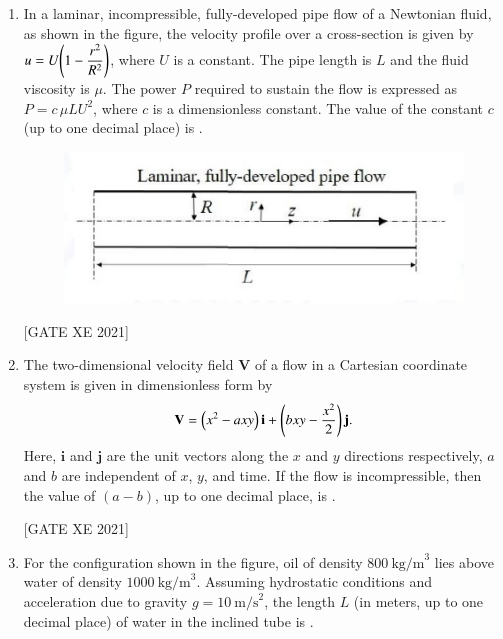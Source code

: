 \documentclass[journal,12pt,onecolumn]{IEEEtran}
\theoremstyle{remark}
\begin{document}
\begin{enumerate}
\hfill[GATE XE 2021]

\begin{multicols}{2}
\begin{enumerate}
\item $a\,u_0\,\mu$
\item $2a\,u_0\,\mu$
\item $3a\,u_0\,\mu$
\item $4a\,u_0\,\mu$
\end{enumerate}
\end{multicols}


\item In a laminar, incompressible, fully-developed pipe flow of a Newtonian fluid, as shown in the figure, the velocity profile over a cross-section is given by $u=U\!\left(1-\dfrac{r^2}{R^2}\right)$, where $U$ is a constant. The pipe length is $L$ and the fluid viscosity is $\mu$. The power $P$ required to sustain the flow is expressed as $P=c\,\mu L U^2$, where $c$ is a dimensionless constant. The value of the constant $c$ (up to one decimal place) is \underline{\hspace{2cm}}.

\begin{figure}[H]
      \centering
      \includegraphics[width=0.5\columnwidth]{figs/fig11.png}
      \caption{}
      \label{fig:placeholder}
  \end{figure}

\hfill[GATE XE 2021]


\item The two-dimensional velocity field $\mathbf{V}$ of a flow in a Cartesian coordinate system is given in dimensionless form by
\begin{align}
\mathbf{V}=\left(x^2 -a x y\right)\mathbf{i}+\left(b x y-\frac{x^2}{2}\right)\mathbf{j}.
\end{align}
Here, $\mathbf{i}$ and $\mathbf{j}$ are the unit vectors along the $x$ and $y$ directions respectively, $a$ and $b$ are independent of $x$, $y$, and time. If the flow is incompressible, then the value of $(a-b)$, up to one decimal place, is \underline{\hspace{2cm}}.

\hfill[GATE XE 2021]


\item For the configuration shown in the figure, oil of density $800\ \text{kg/m}^3$ lies above water of density $1000\ \text{kg/m}^3$. Assuming hydrostatic conditions and acceleration due to gravity $g=10\ \text{m/s}^2$, the length $L$ (in meters, up to one decimal place) of water in the inclined tube is \underline{\hspace{2cm}}.


\end{enumerate}
\end{document}
